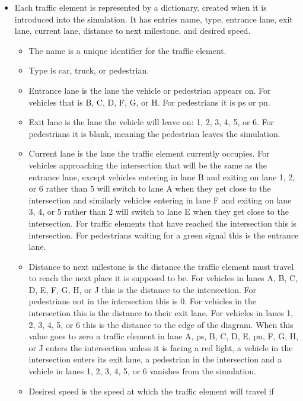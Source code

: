 \documentclass[letterpaper,twoside]{article}
\begin{document}
\begin{itemize}
\item{Each traffic element is represented by a dictionary, created when it is
introduced into the simulation.  It has entries name, type, entrance lane,
exit lane, current lane, distance to next milestone, and desired speed.}

\begin{itemize}

\item{The name is a unique identifier for the traffic element.}
\item{Type is car, truck, or pedestrian.}
\item{Entrance lane is the lane the vehicle or pedestrian
  appears on.  For vehicles that is B, C, D, F, G, or H.  For pedestrians
  it is ps or pn.}
\item{Exit lane is the lane the vehicle will leave on: 1, 2, 3, 4, 5, or 6.
  For pedestrians it is blank, meaning the pedestrian leaves the simulation.}
\item{Current lane is the lane the traffic element currently occupies.
  For vehicles
  approaching the intersection that will be the same as the entrance lane,
  except vehicles entering in lane B and exiting on lane 1, 2, or 6 rather
  than 5 will switch to lane A when they get close to the intersection
  and similarly vehicles entering in lane F and exiting on lane 3, 4, or 5
  rather than 2 will switch to lane E when they get close to the
  intersection.  For traffic elements that have reached the intersection this
  is intersection.  For pedestrians waiting for a green signal
  this is the entrance lane.}
\item{Distance to next milestone is the distance the traffic element
  must travel
  to reach the next place it is supposed to be.  For vehicles in lanes
  A, B, C, D, E, F, G, H, or J this is the distance to the intersection.
  For pedestrians not in the intersection this is 0.
  For vehicles in the intersection this is the distance to their exit
  lane.  For vehicles in lanes 1, 2, 3, 4, 5, or 6 this is the distance
  to the edge of the diagram.  When this value goes to zero a traffic element
  in lane A, ps, B, C, D, E, pn, F, G, H, or J enters the intersection
  unless it is facing a red light,
  a vehicle
  in the intersection enters its exit lane, a pedestrian in the intersection
  and a vehicle in lanes 1, 2, 3, 4, 5, or 6 vanishes from the simulation.}
\item{Desired speed is the speed at which the traffic element will travel if
}
\end{itemize}
\end{itemize}
\end{document}
